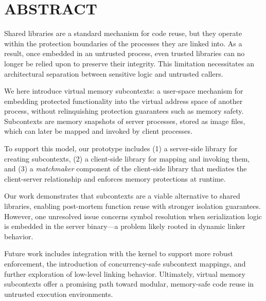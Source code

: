\chapter*{ABSTRACT}
\thispagestyle{fancy} %
Shared libraries are a standard mechanism for code reuse, but they operate within the protection boundaries of the processes they are linked into. As a result, once embedded in an untrusted process, even trusted libraries can no longer be relied upon to preserve their integrity. This limitation necessitates an architectural separation between sensitive logic and untrusted callers.

We here introduce virtual memory subcontexts: a user-space mechanism for embedding protected functionality into the virtual address space of another process, without relinquishing protection guarantees such as memory safety. Subcontexts are memory snapshots of server processes, stored as image files, which can later be mapped and invoked by client processes.

To support this model, our prototype includes (1) a server-side library for creating subcontexts, (2) a client-side library for mapping and invoking them, and (3) a \textit{matchmaker} component of the client-side library that mediates the client-server relationship and enforces memory protections at runtime.

Our work demonstrates that subcontexts are a viable alternative to shared libraries, enabling post-mortem function reuse with stronger isolation guarantees. However, one unresolved issue concerns symbol resolution when serialization logic is embedded in the server binary—a problem likely rooted in dynamic linker behavior.

Future work includes integration with the kernel to support more robust enforcement, the introduction of concurrency-safe subcontext mappings, and further exploration of low-level linking behavior. Ultimately, virtual memory subcontexts offer a promising path toward modular, memory-safe code reuse in untrusted execution environments.
